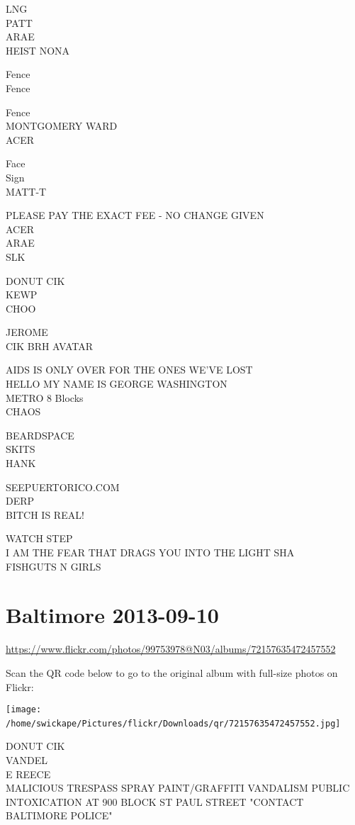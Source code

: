 \documentclass[10pt,letterpaper]{article}
\begin{document}
LNG\\
PATT\\
ARAE\\
HEIST NONA

Fence\\
Fence

Fence\\
MONTGOMERY WARD\\
ACER

Face\\
Sign\\
MATT{-}T

PLEASE PAY THE EXACT FEE {-} NO CHANGE GIVEN\\
ACER\\
ARAE\\
SLK

DONUT CIK\\
KEWP\\
CHOO

JEROME\\
CIK BRH AVATAR

AIDS IS ONLY OVER FOR THE ONES WE'VE LOST\\
HELLO MY NAME IS GEORGE WASHINGTON\\
METRO 8 Blocks\\
CHAOS

BEARDSPACE\\
SKITS\\
HANK

SEEPUERTORICO.COM\\
DERP\\
BITCH IS REAL!

WATCH STEP\\
I AM THE FEAR THAT DRAGS YOU INTO THE LIGHT SHA\\
FISHGUTS N GIRLS
\

\section*{Baltimore 2013-09-10}

\url{https://www.flickr.com/photos/99753978@N03/albums/72157635472457552}

Scan the QR code below to go to the original album with full-size photos on Flickr:

\texttt{[image: /home/swickape/Pictures/flickr/Downloads/qr/72157635472457552.jpg]}
\

DONUT CIK\\
VANDEL\\
E REECE\\
MALICIOUS TRESPASS SPRAY PAINT/GRAFFITI VANDALISM PUBLIC INTOXICATION AT 900 BLOCK ST PAUL STREET "CONTACT BALTIMORE POLICE"
\end{document}
